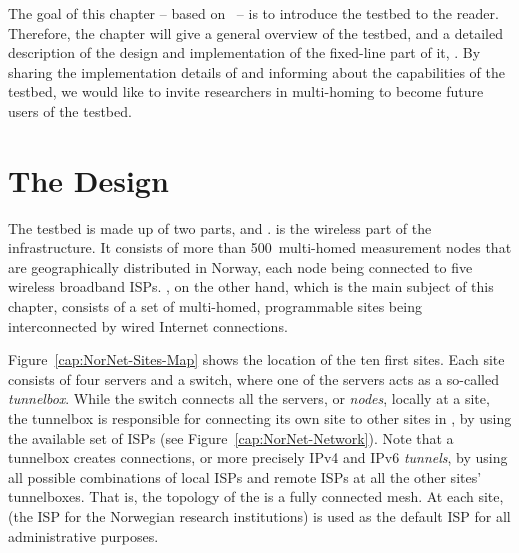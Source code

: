 The goal of this chapter -- based on~\cite{PAMS2013-NorNet,ComNets2013-Core} -- is to introduce the  testbed to the reader. Therefore, the chapter will give a general overview of the testbed, and a detailed description of the design and implementation of the fixed-line part of it, . By sharing the implementation details of  and informing about the capabilities of the testbed, we would like to invite researchers in multi-homing to become future users of the  testbed.



\section{The Design}
\label{sec:Design}

The  testbed is made up of two parts,  and .  is the wireless part of the  infrastructure. It consists of more than 500~multi-homed measurement nodes that are geographically distributed in Norway, each node being connected to five wireless broadband ISPs. , on the other hand, which is the main subject of this chapter, consists of a set of multi-homed, programmable sites being interconnected by wired Internet connections.

Figure~\ref{cap:NorNet-Sites-Map} shows the location of the ten first  sites. Each site consists of four servers and a switch, where one of the servers acts as a so-called \emph{tunnelbox}. While the switch connects all the servers, or \emph{nodes}, locally at a site, the tunnelbox is responsible for connecting its own site to other sites in , by using the available set of ISPs (see Figure~\ref{cap:NorNet-Network}). Note that a tunnelbox creates connections, or more precisely IPv4 and IPv6 \emph{tunnels}, by using all possible combinations of local ISPs and remote ISPs at all the other sites' tunnelboxes. That is, the topology of the  is a fully connected mesh. At each site,  (the ISP for the Norwegian research institutions) is used as the default ISP for all administrative purposes.

